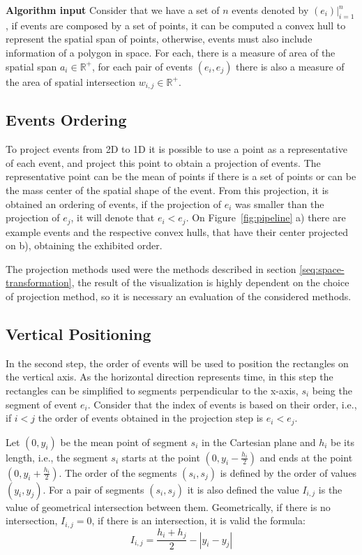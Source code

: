 \textbf{Algorithm input} Consider that we have a set of $n$ events denoted by $(e_i)|_{i = 1}^n$, if events are composed by a set of points, it can be computed a convex hull to represent the spatial span of points, otherwise, events must also include information of a polygon in space. 
%
For each, there is a measure of area of the spatial span $a_i \in \mathbb{R}^+$, for each pair of events $(e_i, e_j)$ there is also a measure of the area of spatial intersection $w_{i, j} \in \mathbb{R}^+$.

\subsection{Events Ordering}

To project events from 2D to 1D it is possible to use a point as a representative of each event, and project this point to obtain a projection of events. 
%
The representative point can be the mean of points if there is a set of points or can be the mass center of the spatial shape of the event.
%
From this projection, it is obtained an ordering of events, if the projection of $e_i$ was smaller than the projection of $e_j$, it will denote that $e_i < e_j$.
%
On Figure~\ref{fig:pipeline} a) there are example events and the respective convex hulls, that have their center projected on b), obtaining the exhibited order.

%
The projection methods used were the methods described in section \ref{seq:space-transformation},
%
the result of the visualization is highly dependent on the choice of projection method, so it is necessary an evaluation of the considered methods.
 
\subsection{Vertical Positioning}

In the second step, the order of events will be used to position the rectangles on the vertical axis. 
%
As the horizontal direction represents time, in this step the rectangles can be simplified to segments perpendicular to the x-axis, $s_i$ being the segment of event $e_i$. Consider that the index of events is based on their order, i.e., if $i < j$  the order of events obtained in the projection step is $e_i < e_j$. 
%

%
Let $(0, y_i)$ be the mean point of segment $s_i$ in the Cartesian plane and $h_i$ be its length, i.e., the segment $s_i$ starts at the point $(0, y_i - \frac{h_i}{2})$ and ends at the point $(0, y_i + \frac{h_i}{2})$. 
%
The order of the segments $(s_i, s_j)$ is defined by the order of values $(y_i, y_j)$.
%
For a pair of segments $(s_i, s_j)$ it is also defined the value $I_{i,j}$ is the value of geometrical intersection between them. Geometrically, if there is no intersection, $I_{i, j} = 0$, if there is an intersection, it is valid the formula:
\begin{equation*}
I_{i, j} = \frac{h_i + h_j}{2} - |y_i - y_j|    
\end{equation*}


